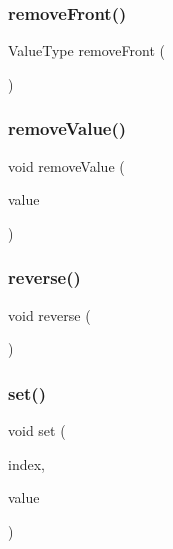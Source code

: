\mbox{\label{classLinkedList_a02453aa96e93c38ca4c1d176307c8a63}} 
\subsubsection{\texorpdfstring{remove\+Front()}{removeFront()}}
{\footnotesize\ttfamily Value\+Type remove\+Front (\begin{DoxyParamCaption}{ }\end{DoxyParamCaption})}

\mbox{\label{classLinkedList_a10e8154a489093d2b1f20596342bcd78}} 
\subsubsection{\texorpdfstring{remove\+Value()}{removeValue()}}
{\footnotesize\ttfamily void remove\+Value (\begin{DoxyParamCaption}\item[{const Value\+Type \&}]{value }\end{DoxyParamCaption})}

\mbox{\label{classLinkedList_a310c0bebc002158f5646a91d60e4dc89}} 
\subsubsection{\texorpdfstring{reverse()}{reverse()}}
{\footnotesize\ttfamily void reverse (\begin{DoxyParamCaption}{ }\end{DoxyParamCaption})}

\mbox{\label{classLinkedList_a004ea6d6bc4a512ce4d52962727d5db2}} 
\subsubsection{\texorpdfstring{set()}{set()}}
{\footnotesize\ttfamily void set (\begin{DoxyParamCaption}\item[{int}]{index,  }\item[{const Value\+Type \&}]{value }\end{DoxyParamCaption})}

